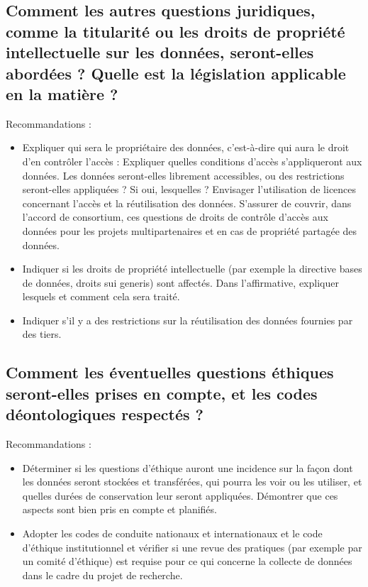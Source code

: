 \documentclass{article}
\begin{document}
\subsection{Comment les autres questions juridiques, comme la titularité ou les droits de propriété intellectuelle sur les données, seront-elles abordées ? Quelle est la législation applicable en la matière ?}
Recommandations :
\begin{itemize}
    \item Expliquer qui sera le propriétaire des données, c'est-à-dire qui aura le droit d’en contrôler l’accès :
    \subitem Expliquer quelles conditions d'accès s'appliqueront aux données. Les données seront-elles librement accessibles, ou des restrictions seront-elles appliquées ? Si oui, lesquelles ? Envisager l'utilisation de licences concernant l'accès et la réutilisation des données.
    \subitem S'assurer de couvrir, dans l’accord de consortium, ces questions de droits de contrôle d'accès aux données pour les projets multipartenaires et en cas de propriété partagée des données.
    \item Indiquer si les droits de propriété intellectuelle (par exemple la directive bases de données, droits sui generis) sont affectés. Dans l'affirmative, expliquer lesquels et comment cela sera traité.
    \item Indiquer s'il y a des restrictions sur la réutilisation des données fournies par des tiers.
\end{itemize}

\subsection{Comment les éventuelles questions éthiques seront-elles prises en compte, et les codes déontologiques respectés ?}
Recommandations :
\begin{itemize}
    \item Déterminer si les questions d'éthique auront une incidence sur la façon dont les données seront stockées et transférées, qui pourra les voir ou les utiliser, et quelles durées de conservation leur seront appliquées. Démontrer que ces aspects sont bien pris en compte et planifiés.
    \item Adopter les codes de conduite nationaux et internationaux et le code d’éthique institutionnel et vérifier si une revue des pratiques (par exemple par un comité d'éthique) est requise  pour ce qui concerne la collecte de données dans le cadre du projet de recherche.
\end{itemize}
\end{document}
